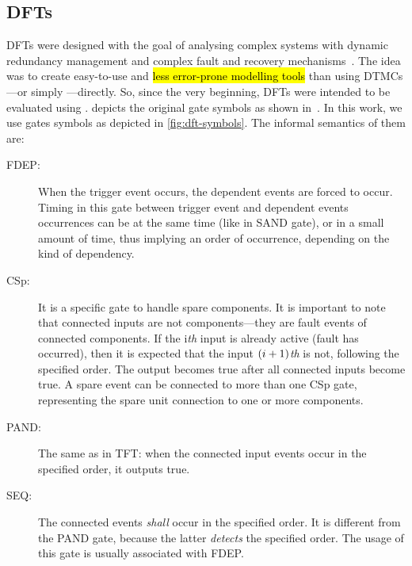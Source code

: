 \documentclass[12pt,openright,twoside,a4paper,oldfontcommands,english,brazil,draft]{abntex2}
\theoremstyle{theo}
\newcommand{\parsin}[1]{\ensuremath\left( #1 \right)}
\begin{document}
\subsection{\Aclp{DFT}}
\label{sec:dynamic-fault-trees}

\begin{sloppypar}
\Aclp{DFT} were designed with the goal of analysing complex systems with dynamic redundancy management and complex fault and recovery mechanisms~\cite{DBB1992}.
The idea was to create easy-to-use and \hl{less error-prone modelling tools}  than using \acp{DTMC}---or simply \emph{}---directly.
So, since the very beginning, \acp{DFT} were intended to be evaluated using .
 depicts the original gate symbols as shown in~\cite{DBB1992,Boyd1992}.
In this work, we use gates symbols as depicted in \cref{fig:dft-symbols}.
The informal semantics of them are:
%
\begin{description}
  \item[\Ac{FDEP}:]
  When the trigger event occurs, the dependent events are forced to occur.
  Timing in this gate between trigger event and dependent events occurrences can be at the same time (like in  \ac{SAND} gate), or in a small amount of time, thus implying an order of occurrence, depending on the kind of dependency.
  \item[\Ac{CSp}:]
  It is a specific gate to handle spare components.
  It is important to note that connected inputs are not components---they are fault events of connected components.
  If the i\emph{th} input is already active (fault has occurred), then it is expected that the input $\parsin{i+1}$\emph{th} is not, following the specified order.
  The output becomes true after all connected inputs become true.
  A spare event can be connected to more than one \ac{CSp} gate, representing the spare unit connection to one or more components.
  \item[\ac{PAND}:]
  The same as in \ac{TFT}: when the connected input events occur in the specified order, it outputs true.
  \item[\Ac{SEQ}:]
  The connected events \emph{shall} occur in the specified order.
  It is different from the \ac{PAND} gate, because the latter \emph{detects} the specified order.
  The usage of this gate is usually associated with \ac{FDEP}.
\end{description}
\end{sloppypar}
\end{document}
